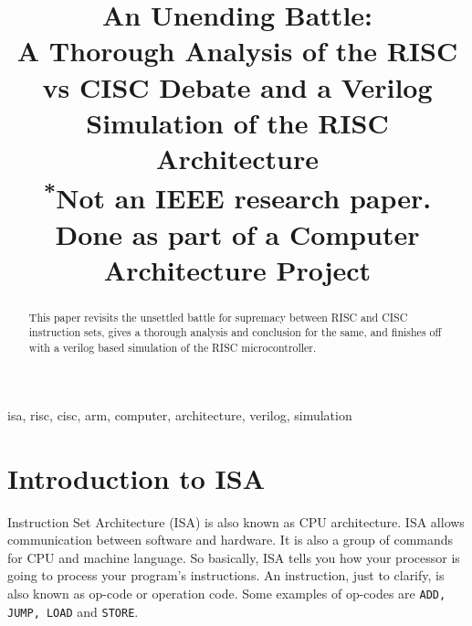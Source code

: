 \documentclass[conference]{IEEEtran}
\begin{document}
\title{An Unending Battle:\\A Thorough Analysis of the RISC vs CISC Debate and a Verilog Simulation of the RISC Architecture\\
{\footnotesize \textsuperscript{*}Not an IEEE research paper. Done as part of a Computer Architecture Project}
}

\author{
\and
{}
}

\maketitle

\begin{abstract}
This paper revisits the unsettled battle for supremacy between RISC and CISC instruction sets, gives a thorough analysis and conclusion for the same, and finishes off with a verilog based simulation of the RISC microcontroller.
\end{abstract}

\begin{IEEEkeywords}
isa, risc, cisc, arm, computer, architecture, verilog, simulation
\end{IEEEkeywords}

\section{Introduction to ISA}
Instruction Set Architecture (ISA) is also known as CPU architecture. ISA allows communication between software and hardware. It is also a group of commands for CPU and machine language. So basically, ISA tells you how your processor is going to process your program's instructions. An instruction, just to clarify, is also known as op-code or operation code. Some examples of op-codes are \verb|ADD, JUMP, LOAD| and \verb|STORE|. 
\end{document}
